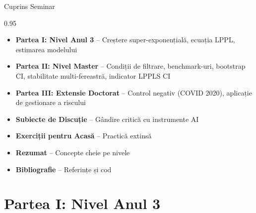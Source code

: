 \documentclass[9pt, aspectratio=169, t]{beamer}
\subtitle{Seminar 13: Modele LPPL pentru Detectarea Bulelor Speculative}
\begin{document}
{
\begin{frame}
    \titlepage
\end{frame}
}

\begin{frame}{Cuprins Seminar}
    \begin{cminipage}{0.95\textwidth}
    \begin{itemize}
        \item \textbf{Partea I: Nivel Anul 3} -- Creștere super-exponențială, ecuația LPPL, estimarea modelului
        \vspace{0.15cm}
        \item \textbf{Partea II: Nivel Master} -- Condiții de filtrare, benchmark-uri, bootstrap CI, stabilitate multi-fereastră, indicator LPPLS CI
        \vspace{0.15cm}
        \item \textbf{Partea III: Extensie Doctorat} -- Control negativ (COVID 2020), aplicație de gestionare a riscului
        \vspace{0.15cm}
        \item \textbf{Subiecte de Discuție} -- Gândire critică cu instrumente AI
        \vspace{0.15cm}
        \item \textbf{Exerciții pentru Acasă} -- Practică extinsă
        \vspace{0.15cm}
        \item \textbf{Rezumat} -- Concepte cheie pe nivele
        \vspace{0.15cm}
        \item \textbf{Bibliografie} -- Referințe și cod
    \end{itemize}
    \end{cminipage}
\end{frame}

\section{Partea I: Nivel Anul 3}
\end{document}
